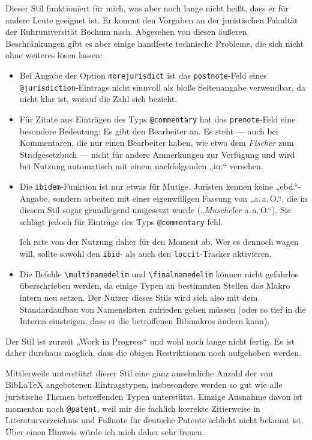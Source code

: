 \documentclass[11pt,a4paper,DIV=calc,draft]{scrartcl}
\newcommand\software[1]{\textsf{#1}}
\newcommand\Biblatex{\software{Bib\LaTeX{}}\xspace}
\begin{document}
Dieser Stil funktioniert für mich, was aber noch lange nicht heißt,
dass er für andere Leute geeignet ist. Er kommt den Vorgaben an der
juristischen Fakultät der Ruhruniversität Bochum nach. Abgesehen von
diesen äußeren Beschränkungen gibt es aber einige handfeste technische
Probleme, die sich nicht ohne weiteres lösen lassen:

\begin{itemize}
\item Bei Angabe der Option \verb+morejurisdict+ ist das
  \verb+postnote+-Feld eines \verb+@jurisdiction+-Eintrags nicht
  sinnvoll als bloße Seitenangabe verwendbar, da nicht klar ist,
  worauf die Zahl sich bezieht.
\item Für Zitate aus Einträgen des Typs \verb+@commentary+ hat das
  \verb+prenote+-Feld eine besondere Bedeutung: Es gibt den Bearbeiter
  an. Es steht — auch bei Kommentaren, die nur einen Bearbeiter haben,
  wie etwa dem \emph{Fischer} zum Strafgesetzbuch — nicht für andere
  Anmerkungen zur Verfügung und wird bei Nutzung automatisch mit einem
  nachfolgenden „in:“ versehen.
\item Die \verb+ibidem+-Funktion ist nur etwas für Mutige. Juristen
  kennen keine „ebd.“-Angabe, sondern arbeiten mit einer eigenwilligen
  Fassung von „a.\,a.\,O.“, die in diesem Stil sogar grundlegend umgesetzt
  wurde („\textit{Muscheler} a.\,a.\,O.“). Sie schlägt jedoch für Einträge
  des Typs \verb+@commentary+ fehl.

  Ich rate von der Nutzung daher für den Moment ab. Wer es dennoch
  wagen will, sollte sowohl den \verb+ibid+- als auch den
  \verb+loccit+-Tracker aktivieren.
\item Die Befehle \verb+\multinamedelim+ und \verb+\finalnamedelim+
  können nicht gefahrlos überschrieben werden, da einige Typen an
  bestimmten Stellen das Makro intern neu setzen. Der Nutzer dieses
  Stils wird sich also mit dem Standardaufbau von Namenslisten
  zufrieden geben müssen (oder so tief in die Interna einsteigen, dass
  er die betroffenen Bibmakros ändern kann).
\end{itemize}

Der Stil ist zurzeit „Work in Progress“ und wohl noch lange nicht
fertig. Es ist daher durchaus möglich, dass die obigen Restriktionen
noch aufgehoben werden.

Mittlerweile unterstützt dieser Stil eine ganz ansehnliche Anzahl der
von \Biblatex angebotenen Eintragstypen, insbesondere werden so gut
wie alle juristische Themen betreffenden Typen unterstützt. Einzige
Ausnahme davon ist momentan noch \verb+@patent+, weil mir die fachlich
korrekte Zitierweise in Literaturverzeichnis und Fußnote für deutsche
Patente schlicht nicht bekannt ist. Über einen Hinweis würde ich mich
daher sehr freuen.
\end{document}
